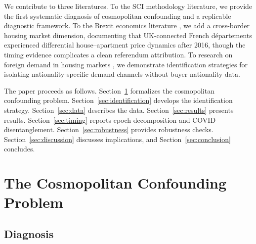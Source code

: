 \documentclass[12pt]{article}
\begin{document}
We contribute to three literatures. To the SCI methodology literature, we provide the first systematic diagnosis of cosmopolitan confounding and a replicable diagnostic framework. To the Brexit economics literature \citep{born2019costs, breinlich2022costs, breinlich2019voting, hassan2024global, bloom2025brexit}, we add a cross-border housing market dimension, documenting that UK-connected French d\'epartements experienced differential house--apartment price dynamics after 2016, though the timing evidence complicates a clean referendum attribution. To research on foreign demand in housing markets \citep{badarinza2019home, favara2015credit}, we demonstrate identification strategies for isolating nationality-specific demand channels without buyer nationality data.

The paper proceeds as follows. Section~\ref{sec:cosmopolitan} formalizes the cosmopolitan confounding problem. Section~\ref{sec:identification} develops the identification strategy. Section~\ref{sec:data} describes the data. Section~\ref{sec:results} presents results. Section~\ref{sec:timing} reports epoch decomposition and COVID disentanglement. Section~\ref{sec:robustness} provides robustness checks. Section~\ref{sec:discussion} discusses implications, and Section~\ref{sec:conclusion} concludes.


\section{The Cosmopolitan Confounding Problem}\label{sec:cosmopolitan}

\subsection{Diagnosis}
\end{document}
